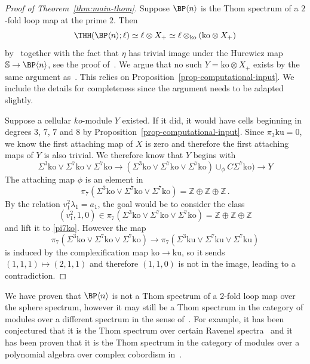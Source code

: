 \begin{proof}[Proof of Theorem~\ref{thm:main-thom}] 
Suppose $\BP\langle n\rangle$ is the Thom spectrum of a $2$-fold loop map at the prime $2$. Then 
\[ \THH(\BP\langle n\rangle;\ell)\simeq \ell \otimes X_{+}\simeq \ell\otimes_{\mathrm{ko}}(\mathrm{ko} \otimes X_+)
\]
by~\cite[Theorem~2]{BCS10} together with the fact that $\eta$ has trivial image under the Hurewicz map $\mathbb{S}\to \BP\langle n\rangle$, see the proof of~\cite[Theorem~2]{Bea17}. We argue that no such $Y=\mathrm{ko}\otimes X_{+}$ exists by the same argument as~\cite{AHL09}. This relies on Proposition~\ref{prop-computational-input}. We include the details for completeness since the argument needs to be adapted slightly. 

Suppose a cellular $ko$-module $Y$ existed. If it did, it would have cells beginning in degrees $3$, $7$, $7$ and $8$ by Proposition~\ref{prop-computational-input}. Since $\pi_3\mathrm{ku}=0$, we know the first attaching map of $X$ is zero and therefore the first attaching maps of $Y$ is also trivial. We therefore know that $Y$ begins with 
\[ \Sigma^{3}\mathrm{ko}\vee \Sigma^{7}\mathrm{ko}\vee \Sigma^{7}\mathrm{ko}\to (\Sigma^{3}\mathrm{ko}\vee \Sigma^{7}\mathrm{ko}\vee \Sigma^{7}\mathrm{ko})\cup_{\phi} C\Sigma^{7}\mathrm{ko})\to Y
\]
The attaching map $\phi$ is an element in 
\begin{equation}\label{pi7ko}\pi_{7} (\Sigma^{3}\mathrm{ko}\vee \Sigma^{7}\mathrm{ko}\vee \Sigma^{7}\mathrm{ko})=\mathbb{Z}\oplus \mathbb{Z}\oplus \mathbb{Z} \,.
\end{equation}
By the relation $v_1^2\lambda_1=a_1$, the goal would be to consider the class 
\[
(v_1^2,1,0) \in \pi_{7} (\Sigma^{3}\mathrm{ko}\vee \Sigma^{7}\mathrm{ko}\vee \Sigma^{7}\mathrm{ko})=\mathbb{Z}\oplus \mathbb{Z}\oplus \mathbb{Z} 
\]
and lift it to \eqref{pi7ko}. However the map 
\[
\pi_7(\Sigma^{3}\mathrm{ko}\vee \Sigma^{7}\mathrm{ko}\vee \Sigma^{7}\mathrm{ko})  \to 
\pi_7(\Sigma^{3}\mathrm{ku}\vee \Sigma^{7}\mathrm{ku}\vee \Sigma^{7}\mathrm{ku}) 
\]
is induced by the complexification map $\mathrm{ko}\to \mathrm{ku}$, so it sends $(1,1,1)\mapsto (2,1,1)$ and therefore $(1,1,0)$ is not in the image, leading to a contradiction. 
\end{proof}

\begin{remark}
We have proven that $\BP\langle n\rangle$ is not a Thom spectrum of a $2$-fold loop map over the sphere spectrum, however it may still be a Thom spectrum in the category of modules over a different spectrum in the sense of~\cite{ABGHR14}. For example, it has been conjectured that it is the Thom spectrum over certain Ravenel spectra~\cite[Conjecture~1.1.3]{Dev24} and it has been proven that it is the Thom spectrum in the category of modules over a polynomial algebra over complex cobordism in~\cite{Qui25}. 
\end{remark}